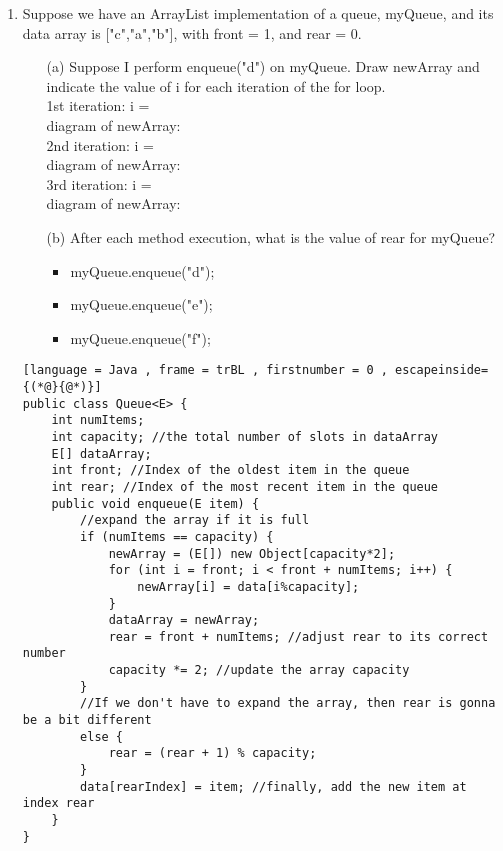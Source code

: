 \documentclass[letter]{article}
\begin{document}
\begin{enumerate}[1.]
\begin{lstlisting}[language = Java , frame = trBL , firstnumber = 0 , escapeinside={(*@}{@*)}]
}
    \end{lstlisting}
    
    \newpage
    \item Suppose we have an ArrayList implementation of a queue, myQueue, and its data array is ["c","a","b"], with front = 1, and rear = 0. 
    \begin{itemize}
        \item [(a)] Suppose I perform enqueue("d") on myQueue. Draw newArray and indicate the value of i for each iteration of the for loop.\\
        
        1st iteration: i = \\
        diagram of newArray:\\

        2nd iteration: i = \\
        diagram of newArray:\\

        3rd iteration: i = \\
        diagram of newArray:\\
        
        \item [(b)] After each method execution, what is the value of rear for myQueue?
            \begin{itemize}
                \item myQueue.enqueue("d"); 
                \item myQueue.enqueue("e"); 
                \item myQueue.enqueue("f"); 
            \end{itemize}
        
    \end{itemize} 

    \begin{lstlisting}[language = Java , frame = trBL , firstnumber = 0 , escapeinside={(*@}{@*)}]
public class Queue<E> {
    int numItems;
    int capacity; //the total number of slots in dataArray
    E[] dataArray;
    int front; //Index of the oldest item in the queue
    int rear; //Index of the most recent item in the queue
    public void enqueue(E item) {
        //expand the array if it is full
        if (numItems == capacity) {
            newArray = (E[]) new Object[capacity*2];
            for (int i = front; i < front + numItems; i++) {
                newArray[i] = data[i%capacity];
            }
            dataArray = newArray;
            rear = front + numItems; //adjust rear to its correct number
            capacity *= 2; //update the array capacity
        }
        //If we don't have to expand the array, then rear is gonna be a bit different
        else {
            rear = (rear + 1) % capacity;
        }
        data[rearIndex] = item; //finally, add the new item at index rear
    }
}

    \end{lstlisting}
\end{enumerate}
\end{document}
